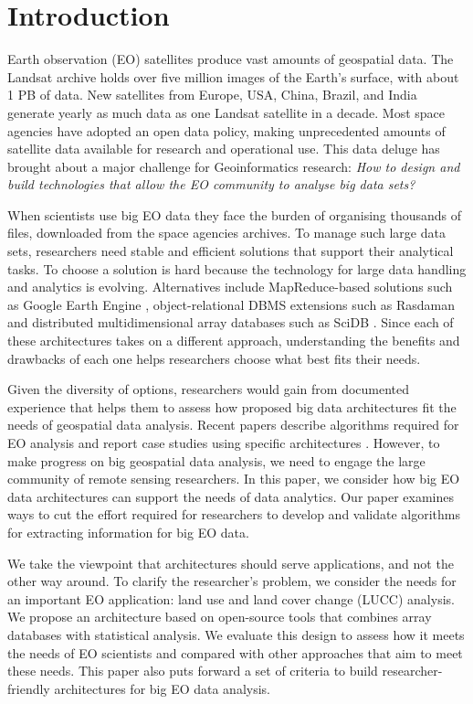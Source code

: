 \documentclass[a4paper, 11pt]{article}
\begin{document}
\section{Introduction}
\label{sec:introduction}

Earth observation (EO) satellites produce vast amounts of geospatial data. The Landsat archive holds over five million images of the Earth's surface, with about 1 PB of data. New satellites from Europe, USA, China, Brazil, and India generate yearly as much data as one Landsat satellite in a decade. Most space agencies have adopted an open data policy, making unprecedented amounts of satellite data available for research and operational use. This data deluge has brought about a major challenge for Geoinformatics research: \textit{How to design and build technologies that allow the EO community to analyse big data sets?}

When scientists use big EO data they face the burden of organising thousands of files, downloaded from the space agencies archives. To manage such large data sets, researchers need stable and efficient solutions that support their analytical tasks. To choose a solution is hard because the technology for large data handling and analytics is evolving. Alternatives include MapReduce-based solutions such as Google Earth Engine \cite{Gorelick2012}, object-relational DBMS extensions such as Rasdaman \cite{Baumann1998} and  distributed multidimensional array databases such as SciDB \cite{Stonebraker2013}. Since each of these architectures takes on a different approach, understanding the benefits and drawbacks of each one helps researchers choose what best fits their needs.

Given the diversity of options, researchers would gain from documented experience that helps them to assess how proposed big data architectures fit the needs of geospatial data analysis. Recent papers describe algorithms required for EO analysis \cite{Vatsavai2012} \cite{Nativi2015} and report case studies using specific architectures \cite{Planthaber2012}\cite{Krcal2015}. However, to make progress on big geospatial data analysis, we need to engage the large community of remote sensing researchers. In this paper, we consider how big EO data architectures can support the needs of data analytics. Our paper examines ways to cut the effort required for researchers to develop and validate algorithms for extracting information for big EO data.

We take the viewpoint that architectures should serve applications, and not the other way around. To clarify the researcher's problem, we consider the needs for an important EO application: land use and land cover change (LUCC) analysis. We propose an architecture based on open-source tools that combines array databases with statistical analysis.  We evaluate this design to assess how it meets the needs of EO scientists and compared with other approaches that aim to meet these needs. This paper also puts forward a set of criteria to build researcher-friendly architectures for big EO data analysis.

%

\end{document}
